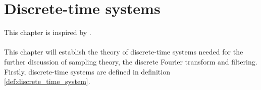\chapter{Discrete-time systems}\label{discrete_time_systems}
This chapter is inspired by \cite{FSP}.\\\\
This chapter will establish the theory of discrete-time systems needed for the further discussion of sampling theory, the discrete Fourier transform and filtering. Firstly, discrete-time systems are defined in definition \ref{def:discrete_time_system}.

